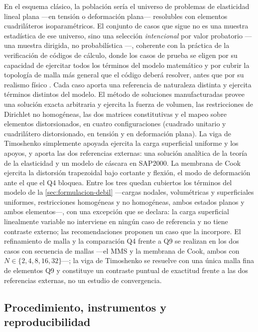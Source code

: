 En el esquema clásico, la población sería el universo de problemas de elasticidad lineal plana —en tensión o deformación plana— resolubles con elementos cuadriláteros isoparamétricos. El conjunto de casos que sigue no es una muestra estadística de ese universo, sino una selección \emph{intencional} por valor probatorio —una muestra dirigida, no probabilística \autocite[p.~215]{sampieri2018metodologia}—, coherente con la práctica de la verificación de códigos de cálculo, donde los casos de prueba se eligen por su capacidad de ejercitar todos los términos del modelo matemático y por cubrir la topología de malla más general que el código deberá resolver, antes que por su realismo físico \autocite{oberkampf2010vv}. Cada caso aporta una referencia de naturaleza distinta y ejercita términos distintos del modelo. El método de soluciones manufacturadas provee una solución exacta arbitraria y ejercita la fuerza de volumen, las restricciones de Dirichlet no homogéneas, las dos matrices constitutivas y el mapeo sobre elementos distorsionados, en cuatro configuraciones (cuadrado unitario y cuadrilátero distorsionado, en tensión y en deformación plana). La viga de Timoshenko simplemente apoyada ejercita la carga superficial uniforme y los apoyos, y aporta las dos referencias externas: una solución analítica de la teoría de la elasticidad y un modelo de cáscara en SAP2000. La membrana de Cook ejercita la distorsión trapezoidal bajo cortante y flexión, el modo de deformación ante el que el Q4 bloquea. Entre los tres quedan cubiertos los términos del modelo de la \autoref{sec:formulacion-debil} —cargas nodales, volumétricas y superficiales uniformes, restricciones homogéneas y no homogéneas, ambos estados planos y ambos elementos—, con una excepción que se declara: la carga superficial linealmente variable no interviene en ningún caso de referencia y no tiene contraste externo; las recomendaciones proponen un caso que la incorpore. El refinamiento de malla y la comparación Q4 frente a Q9 se realizan en los dos casos con secuencia de mallas —el MMS y la membrana de Cook, ambos con $N\in\{2,4,8,16,32\}$—; la viga de Timoshenko se resuelve con una única malla fina de elementos Q9 y constituye un contraste puntual de exactitud frente a las dos referencias externas, no un estudio de convergencia.

\subsection{Procedimiento, instrumentos y reproducibilidad}
\label{sec:validacion-datos}


